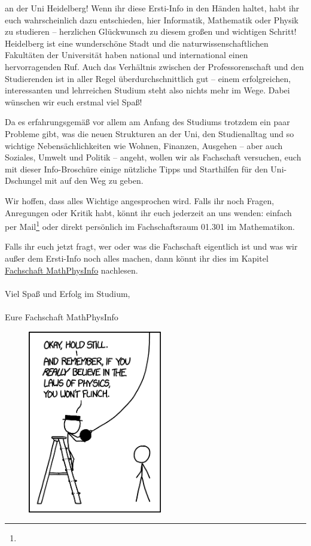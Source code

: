 
an der Uni Heidelberg! Wenn ihr diese Ersti-Info in den Händen haltet, habt ihr euch wahrscheinlich dazu entschieden, hier Informatik, Mathematik oder Physik zu studieren -- herzlichen Glückwunsch zu diesem großen und wichtigen Schritt! Heidelberg ist eine wunderschöne Stadt und die naturwissenschaftlichen Fakultäten der Universität haben national und international einen hervorragenden Ruf. Auch das Verhältnis zwischen der Professorenschaft und den Studierenden ist in aller Regel überdurchschnittlich gut -- einem erfolgreichen, interessanten und lehrreichen Studium steht also nichts mehr im Wege. Dabei wünschen wir euch erstmal viel Spaß! \smiley

Da es erfahrungsgemäß vor allem am Anfang des Studiums trotzdem ein paar Probleme gibt, was die neuen Strukturen an der Uni, den Studienalltag und so wichtige Nebensächlichkeiten wie Wohnen, Finanzen, Ausgehen -- aber auch Soziales, Umwelt und Politik -- angeht, wollen wir als Fachschaft versuchen, euch mit dieser Info-Broschüre einige nützliche Tipps und Starthilfen für den Uni-Dschungel mit auf den Weg zu geben.

\vfill
\eject

Wir hoffen, dass alles Wichtige angesprochen wird. Falls ihr noch Fragen, Anregungen oder Kritik habt, könnt ihr euch jederzeit an uns wenden: einfach per Mail\footnote{} oder direkt persönlich im Fachschaftsraum 01.301 im Mathematikon.

Falls ihr euch jetzt fragt, wer oder was die Fachschaft eigentlich ist und was wir außer dem Ersti-Info noch alles machen, dann könnt ihr dies im Kapitel \hyperref[diefsmathphys]{Fachschaft MathPhysInfo} nachlesen. \\\\

\noindent Viel Spaß und Erfolg im Studium,\\\\

Eure Fachschaft MathPhysInfo


\begin{figure}[b]
\centering
\includegraphics[height=8cm]{bilder/laws_of_physics_2x.png}
\end{figure}
